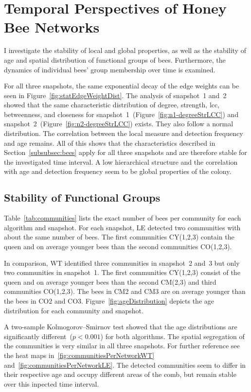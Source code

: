\section{Temporal Perspectives of Honey Bee Networks}
I investigate the stability of local and global properties, as well as the stability of age and spatial distribution of functional groups of bees.
Furthermore, the dynamics of individual bees' group membership over time is examined.

For all three snapshots, the same exponential decay of the edge weights can be seen in Figure~\ref{fig:statEdgeWeightDist}.
The analysis of snapshot~1 and~2 showed that the same characteristic distribution of degree, strength, lcc, betweenness, and closeness for snapshot~1~(Figure~\ref{fig:n1-degreeStrLCC}) and snapshot~2~(Figure~\ref{fig:n2-degreeStrLCC}) exists. They also follow a normal distribution. The correlation between the local measure and detection frequency and age remains.
All of this shows that the characteristics described in Section~\ref{subsubsec:bees} apply for all three snapshots and are therefore stable for the investigated time interval. A low hierarchical structure and the correlation with age and detection frequency seem to be global properties of the colony.

\subsection{Stability of Functional Groups}
Table~\ref{tab:communities} lists the exact number of bees per community for each algorithm and snapshot.
For each snapshot, LE detected two communities with about the same number of bees.
The first communities CY(1,2,3) contain the queen and on average younger bees than the second communities CO(1,2,3).

In comparison, WT identified three communities in snapshot~2 and~3 but only two communities in snapshot~1.
The first communities CY(1,2,3) consist of the queen and on average younger bees than the second CM(2,3) and third communities CO(1,2,3).
The bees in CM2 and CM3 are on average younger than the bees in CO2 and CO3.
Figure~\ref{fig:ageDistribution} depicts the age distribution for each community and snapshot.

A two-sample Kolmogorov–Smirnov test showed that the age distributions are significantly different~($p< 0.001$) for both algorithms.
The spatial segregation of the communities is very similar in all three snapshots. For further reference see the heat maps in~\ref{fig:communitiesPerNetworkWT} and~\ref{fig:communitiesPerNetworkLE}.
The detected communities seem to differ in their respective age and occupy different areas of the comb, but remain stable over this inpected time interval.

